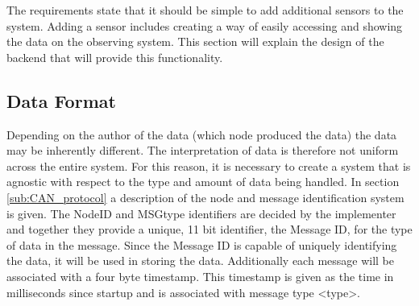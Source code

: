 The requirements state that it should be simple to add additional sensors to the system.
Adding a sensor includes creating a way of easily accessing and showing the data on the observing system.
This section will explain the design of the backend that will provide this functionality.

\subsection{Data Format}
Depending on the author of the data (which node produced the data) the data may be inherently different.
The interpretation of data is therefore not uniform across the entire system.
For this reason, it is necessary to create a system that is agnostic with respect to the type and amount of data being handled.
In section \ref{sub:CAN_protocol} a description of the node and message identification system is given.
The NodeID and MSGtype identifiers are decided by the implementer and together they provide a unique, 11 bit identifier, the Message ID, for the type of data in the message.
Since the Message ID is capable of uniquely identifying the data, it will be used in storing the data.
Additionally each message will be associated with a four byte timestamp.
This timestamp is given as the time in milliseconds since startup and is associated with message type <type>. 

